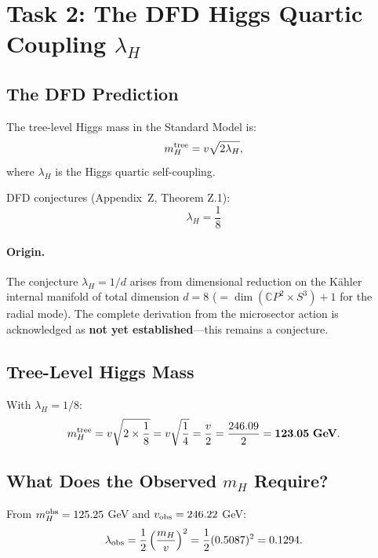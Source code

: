 \documentclass[11pt]{article}
\theoremstyle{definition}
\begin{document}
\section{Task 2: The DFD Higgs Quartic Coupling $\lambda_H$}
\label{sec:lambda}

\subsection{The DFD Prediction}

The tree-level Higgs mass in the Standard Model is:
\begin{equation}\label{eq:mH-tree}
m_H^{\rm tree} = v\sqrt{2\lambda_H},
\end{equation}
where $\lambda_H$ is the Higgs quartic self-coupling.

DFD conjectures (Appendix~Z, Theorem Z.1):
\begin{equation}\label{eq:lambda}
\boxed{\lambda_H = \frac{1}{8}}
\end{equation}

\paragraph{Origin.} The conjecture $\lambda_H = 1/d$ arises from
dimensional reduction on the K\"ahler internal manifold of total
dimension $d = 8$ ($= \dim(\mathbb{C}P^2 \times S^3) + 1$ for the
radial mode). The complete derivation from the microsector action is
acknowledged as \textbf{not yet established}---this remains a conjecture.

\subsection{Tree-Level Higgs Mass}

With $\lambda_H = 1/8$:
\begin{equation}
m_H^{\rm tree} = v\sqrt{2 \times \frac{1}{8}} = v\sqrt{\frac{1}{4}}
= \frac{v}{2} = \frac{246.09}{2} = \mathbf{123.05~\textbf{GeV}}.
\end{equation}

\subsection{What Does the Observed $m_H$ Require?}

From $m_H^{\rm obs} = 125.25$ GeV and $v_{\rm obs} = 246.22$ GeV:
\begin{equation}
\lambda_{\rm obs} = \frac{1}{2}\left(\frac{m_H}{v}\right)^2
= \frac{1}{2}(0.5087)^2 = 0.1294.
\end{equation}
\end{document}
